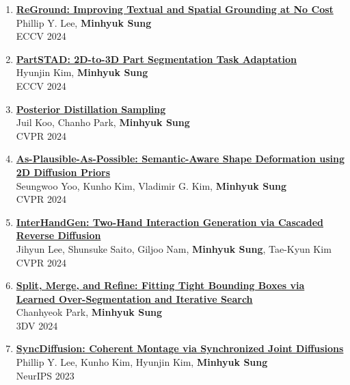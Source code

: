 \documentclass[letterpaper,10pt]{article} %
\newcommand{\blankline}{\quad\pagebreak[2]}
\begin{document}
{{\begin{enumerate}
\item \label{eccv24_2}
\href{https://arxiv.org/abs/2403.13589}{\textbf{ReGround: Improving Textual and Spatial Grounding at No Cost}}\\
Phillip Y. Lee, \textbf{Minhyuk Sung}\\
ECCV 2024\\
\blankline

\item \label{eccv24_1}
\href{https://arxiv.org/abs/2401.05906}{\textbf{PartSTAD: 2D-to-3D Part Segmentation Task Adaptation}}\\
Hyunjin Kim, \textbf{Minhyuk Sung}\\
ECCV 2024\\
\blankline

\item \label{cvpr24_3}
\href{https://arxiv.org/abs/2311.13831}{\textbf{Posterior Distillation Sampling}}\\
Juil Koo, Chanho Park, \textbf{Minhyuk Sung}\\
CVPR 2024\\
\blankline

\item \label{cvpr24_2}
\href{https://arxiv.org/abs/2311.16739}{\textbf{As-Plausible-As-Possible: Semantic-Aware Shape Deformation using 2D Diffusion Priors}}\\
Seungwoo Yoo, Kunho Kim, Vladimir G. Kim, \textbf{Minhyuk Sung}\\
CVPR 2024\\
\blankline

\item \label{cvpr24_1}
\href{https://arxiv.org/abs/2403.17422}{\textbf{InterHandGen: Two-Hand Interaction Generation via Cascaded Reverse Diffusion}}\\
Jihyun Lee, Shunsuke Saito, Giljoo Nam, \textbf{Minhyuk Sung}, Tae-Kyun Kim\\
CVPR 2024\\
\blankline

\item \label{3dv24}
\href{https://arxiv.org/abs/2304.04336}{\textbf{Split, Merge, and Refine: Fitting Tight Bounding Boxes via Learned Over-Segmentation and Iterative Search}}\\
Chanhyeok Park, \textbf{Minhyuk Sung}\\
3DV 2024\\
\blankline

\item \label{neurips23_2}
\href{https://arxiv.org/abs/2306.05178}{\textbf{SyncDiffusion: Coherent Montage via Synchronized Joint Diffusions}}\\
Phillip Y. Lee, Kunho Kim, Hyunjin Kim, \textbf{Minhyuk Sung}\\
NeurIPS 2023\\
\blankline


\end{enumerate}}}
\end{document}

